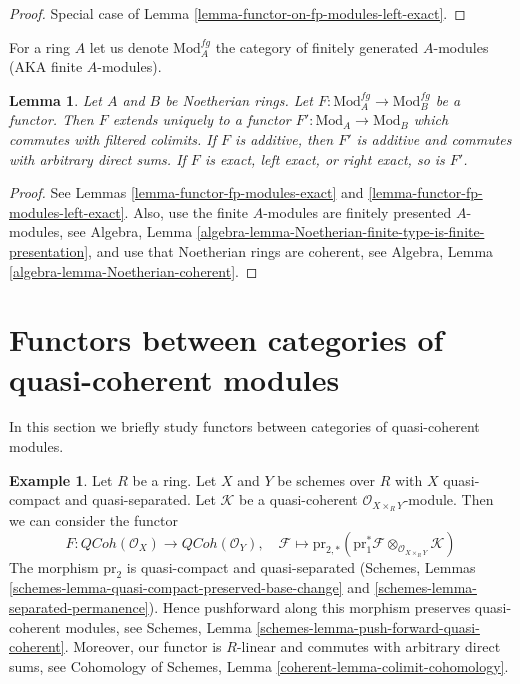 \documentclass{stacks-project}
\theoremstyle{plain}
\newtheorem{lemma}[subsection]{Lemma}
\theoremstyle{definition}
\newtheorem{example}[subsection]{Example}
\theoremstyle{remark}
\numberwithin{equation}{subsection}
\def\QCoh{\mathit{QCoh}}
\begin{document}
\begin{proof}
Special case of Lemma \ref{lemma-functor-on-fp-modules-left-exact}.
\end{proof}

\noindent
For a ring $A$ let us denote $\text{Mod}^{fg}_A$ the category of
finitely generated $A$-modules (AKA finite $A$-modules).

\begin{lemma}
\label{lemma-functor-finite-modules}
Let $A$ and $B$ be Noetherian rings. Let
$F : \text{Mod}^{fg}_A \to \text{Mod}^{fg}_B$ be a functor.
Then $F$ extends uniquely to a functor $F' : \text{Mod}_A \to \text{Mod}_B$
which commutes with filtered colimits. If $F$ is additive, then
$F'$ is additive and commutes with arbitrary direct sums.
If $F$ is exact, left exact, or right exact, so is $F'$.
\end{lemma}

\begin{proof}
See Lemmas \ref{lemma-functor-fp-modules-exact} and
\ref{lemma-functor-fp-modules-left-exact}.
Also, use the finite $A$-modules are finitely presented $A$-modules,
see Algebra, Lemma
\ref{algebra-lemma-Noetherian-finite-type-is-finite-presentation},
and use that Noetherian rings are coherent, see
Algebra, Lemma \ref{algebra-lemma-Noetherian-coherent}.
\end{proof}









\section{Functors between categories of quasi-coherent modules}
\label{section-functor-quasi-coherent}

\noindent
In this section we briefly study functors between categories of
quasi-coherent modules.

\begin{example}
\label{example-functor-quasi-coherent}
Let $R$ be a ring. Let $X$ and $Y$ be
schemes over $R$ with $X$ quasi-compact and quasi-separated.
Let $\mathcal{K}$ be a quasi-coherent $\mathcal{O}_{X \times_R Y}$-module.
Then we can consider the functor
\begin{equation}
\label{equation-FM-QCoh}
F : \QCoh(\mathcal{O}_X) \longrightarrow \QCoh(\mathcal{O}_Y),\quad
\mathcal{F} \longmapsto
\text{pr}_{2, *}(\text{pr}_1^*\mathcal{F}
\otimes_{\mathcal{O}_{X \times_R Y}} \mathcal{K})
\end{equation}
The morphism $\text{pr}_2$ is quasi-compact and quasi-separated
(Schemes, Lemmas \ref{schemes-lemma-quasi-compact-preserved-base-change}
and \ref{schemes-lemma-separated-permanence}). Hence pushforward along
this morphism preserves quasi-coherent modules, see
Schemes, Lemma \ref{schemes-lemma-push-forward-quasi-coherent}.
Moreover, our functor is $R$-linear and commutes with arbitrary direct sums,
see Cohomology of Schemes, Lemma \ref{coherent-lemma-colimit-cohomology}.
\end{example}
\end{document}
